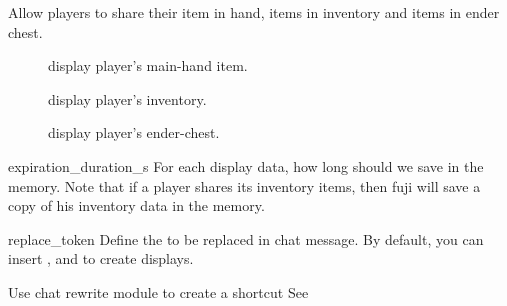Allow players to share their item in hand, items in inventory and items in ender chest.

\begin{description}
    \item [] display player's main-hand item.
    \item[] display player's inventory.
    \item[] display player's ender-chest.
\end{description}

\begin{Configuration}
    \item[expiration\_duration\_s]{
        For each display data, how long should we save in the memory.
        Note that if a player shares its inventory items, then fuji will save a copy of his inventory data in the memory.
    }

    \item[replace\_token] {
        Define the  to be replaced in chat message.
        By default, you can insert \str{[item]}, \str{[inv]} and \str{[ender]} to create displays.
    }

\end{Configuration}

\begin{example}{Use chat rewrite module to create a shortcut}
    See~
\end{example}